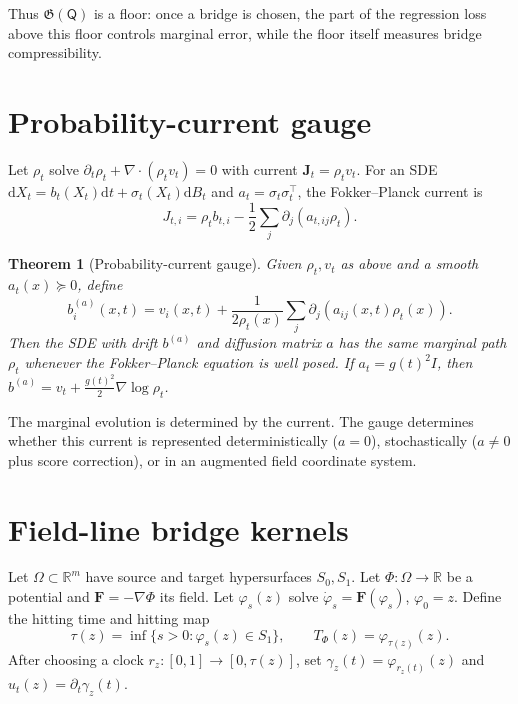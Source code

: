 \documentclass{article}
\newtheorem{theorem}{Theorem}
\numberwithin{equation}{section}
\newcommand{\R}{\mathbb{R}}
\newcommand{\dd}{\mathrm{d}}
\newcommand{\scrQ}{\mathsf{Q}}
\newcommand{\F}{\bm F}
\newcommand{\J}{\bm J}
\begin{document}
Thus $\mathfrak G(\scrQ)$ is a floor: once a bridge is chosen, the part of the regression loss above this floor controls marginal error, while the floor itself measures bridge compressibility.

\section{Probability-current gauge}
\label{sec:gauge}

Let $\rho_t$ solve $\partial_t\rho_t+\nabla\cdot(\rho_t v_t)=0$ with current $\J_t=\rho_t v_t$. For an SDE $\dd X_t=b_t(X_t)\dd t+\sigma_t(X_t)\dd B_t$ and $a_t=\sigma_t\sigma_t^\top$, the Fokker--Planck current is
\begin{equation}
    J_{t,i}=\rho_t b_{t,i}-\frac12\sum_j\partial_j(a_{t,ij}\rho_t).
\end{equation}

\begin{theorem}[Probability-current gauge]
\label{thm:gauge}
Given $\rho_t,v_t$ as above and a smooth $a_t(x)\succeq0$, define
\begin{equation}
    b_i^{(a)}(x,t)=v_i(x,t)+\frac{1}{2\rho_t(x)}\sum_j\partial_j(a_{ij}(x,t)\rho_t(x)).
    \label{eq:gauge_drift}
\end{equation}
Then the SDE with drift $b^{(a)}$ and diffusion matrix $a$ has the same marginal path $\rho_t$ whenever the Fokker--Planck equation is well posed. If $a_t=g(t)^2I$, then $b^{(a)}=v_t+\frac{g(t)^2}{2}\nabla\log\rho_t$.
\end{theorem}

The marginal evolution is determined by the current. The gauge determines whether this current is represented deterministically ($a=0$), stochastically ($a\neq0$ plus score correction), or in an augmented field coordinate system.

\section{Field-line bridge kernels}
\label{sec:field}

Let $\Omega\subset\R^m$ have source and target hypersurfaces $S_0,S_1$. Let $\Phi:\Omega\to\R$ be a potential and $\F=-\nabla\Phi$ its field. Let $\varphi_s(z)$ solve $\dot\varphi_s=\F(\varphi_s)$, $\varphi_0=z$. Define the hitting time and hitting map
\begin{equation}
    \tau(z)=\inf\{s>0:\varphi_s(z)\in S_1\},\qquad T_\Phi(z)=\varphi_{\tau(z)}(z).
\end{equation}
After choosing a clock $r_z:[0,1]\to[0,\tau(z)]$, set $\gamma_z(t)=\varphi_{r_z(t)}(z)$ and $u_t(z)=\partial_t\gamma_z(t)$.
\end{document}
